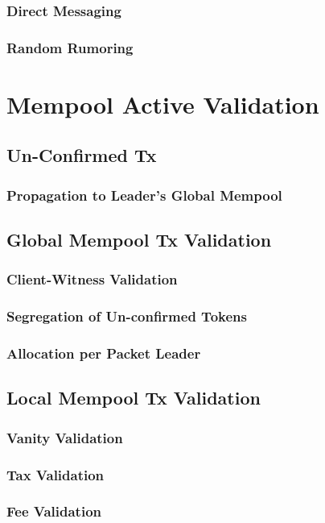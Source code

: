 \documentclass[a4paper,11pt]{article}
\begin{document}
\subsubsection{Direct Messaging}
\subsubsection{Random Rumoring}


\section{Mempool Active Validation}
\subsection{Un-Confirmed Tx}
\subsubsection{Propagation to Leader's Global Mempool}
\subsection{Global Mempool Tx Validation}
\subsubsection{Client-Witness Validation}
\subsubsection{Segregation of Un-confirmed Tokens}
\subsubsection{Allocation per Packet Leader}
\subsection{Local Mempool Tx Validation}
\subsubsection{Vanity Validation}
\subsubsection{Tax Validation}
\subsubsection{Fee Validation}
\end{document}

